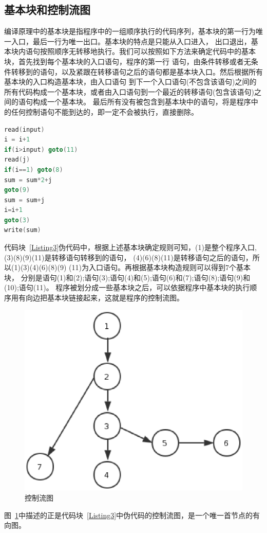 \subsection{基本块和控制流图}
编译原理中的基本块是指程序中的一组顺序执行的代码序列，基本块的第一行为唯一入口，最后一行为唯一出口。基本块的特点是只能从入口进入，
出口退出，基本块内语句按照顺序无转移地执行。我们可以按照如下方法来确定代码中的基本块，首先找到每个基本块的入口语句，程序的第一行
语句，由条件转移或者无条件转移到的语句，以及紧跟在转移语句之后的语句都是基本块入口。然后根据所有基本块的入口构造基本块，由入口语句
到下一个入口语句(不包含该语句)之间的所有代码构成一个基本块，或者由入口语句到一个最近的转移语句(包含该语句)之间的语句构成一个基本块。
最后所有没有被包含到基本块中的语句，将是程序中的任何控制语句不能到达的，即一定不会被执行，直接删除。
\begin{lstlisting}[label=Listing3,caption=基本块划分,language=C, keywordstyle=\color{blue!70},commentstyle=\color{red!50!green!50!blue!50},frame=shadowbox, rulesepcolor=\color{red!20!green!20!blue!20}] 
read(input)
i = i+1
if(i>input) goto(11) 
read(j)
if(i==1) goto(8)
sum = sum*2+j
goto(9)
sum = sum+j
i=i+1
goto(3)
write(sum)
\end{lstlisting}
代码块~\ref{Listing3}伪代码中，根据上述基本块确定规则可知，(1)是整个程序入口,(3)(8)(9)(11)是转移语句转移到的语句，
(4)(6)(8)(11)是转移语句之后的语句，所以(1)(3)(4)(6)(8)(9) (11)为入口语句。再根据基本块构造规则可以得到7个基本块，
分别是语句(1)和(2);语句(3);语句(4)和(5);语句(6)和(7);语句(8);语句(9)和(10);语句(11)。
程序被划分成一些基本块之后，可以依据程序中基本块的执行顺序用有向边把基本块链接起来，这就是程序的控制流图。
\begin{figure}
\centering
\includegraphics[width=0.6\linewidth]{figure7.eps}
\caption{控制流图}\label{figure7}
\end{figure}
图~\ref{figure7}中描述的正是代码块~\ref{Listing3}中伪代码的控制流图，是一个唯一首节点的有向图。

